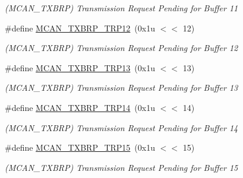 \begin{DoxyCompactItemize}
\begin{DoxyCompactList}\small\item\em (M\+C\+A\+N\+\_\+\+T\+X\+B\+RP) Transmission Request Pending for Buffer 11 \end{DoxyCompactList}\item 
\mbox{\label{group__SAMV71__MCAN_ga2583141978bb71ee3b20ba43a4fa4706}} 
\#define \mbox{\hyperlink{group__SAMV71__MCAN_ga2583141978bb71ee3b20ba43a4fa4706}{M\+C\+A\+N\+\_\+\+T\+X\+B\+R\+P\+\_\+\+T\+R\+P12}}~(0x1u $<$$<$ 12)
\begin{DoxyCompactList}\small\item\em (M\+C\+A\+N\+\_\+\+T\+X\+B\+RP) Transmission Request Pending for Buffer 12 \end{DoxyCompactList}\item 
\mbox{\label{group__SAMV71__MCAN_ga876aeed950e4c0ece9c8f4fb133a67cf}} 
\#define \mbox{\hyperlink{group__SAMV71__MCAN_ga876aeed950e4c0ece9c8f4fb133a67cf}{M\+C\+A\+N\+\_\+\+T\+X\+B\+R\+P\+\_\+\+T\+R\+P13}}~(0x1u $<$$<$ 13)
\begin{DoxyCompactList}\small\item\em (M\+C\+A\+N\+\_\+\+T\+X\+B\+RP) Transmission Request Pending for Buffer 13 \end{DoxyCompactList}\item 
\mbox{\label{group__SAMV71__MCAN_ga831aad854696a327b7a989e5b4164b23}} 
\#define \mbox{\hyperlink{group__SAMV71__MCAN_ga831aad854696a327b7a989e5b4164b23}{M\+C\+A\+N\+\_\+\+T\+X\+B\+R\+P\+\_\+\+T\+R\+P14}}~(0x1u $<$$<$ 14)
\begin{DoxyCompactList}\small\item\em (M\+C\+A\+N\+\_\+\+T\+X\+B\+RP) Transmission Request Pending for Buffer 14 \end{DoxyCompactList}\item 
\mbox{\label{group__SAMV71__MCAN_gae52139842401a6e4cfcf388af72c98d9}} 
\#define \mbox{\hyperlink{group__SAMV71__MCAN_gae52139842401a6e4cfcf388af72c98d9}{M\+C\+A\+N\+\_\+\+T\+X\+B\+R\+P\+\_\+\+T\+R\+P15}}~(0x1u $<$$<$ 15)
\begin{DoxyCompactList}\small\item\em (M\+C\+A\+N\+\_\+\+T\+X\+B\+RP) Transmission Request Pending for Buffer 15 \end{DoxyCompactList}\item 

\end{DoxyCompactItemize}
